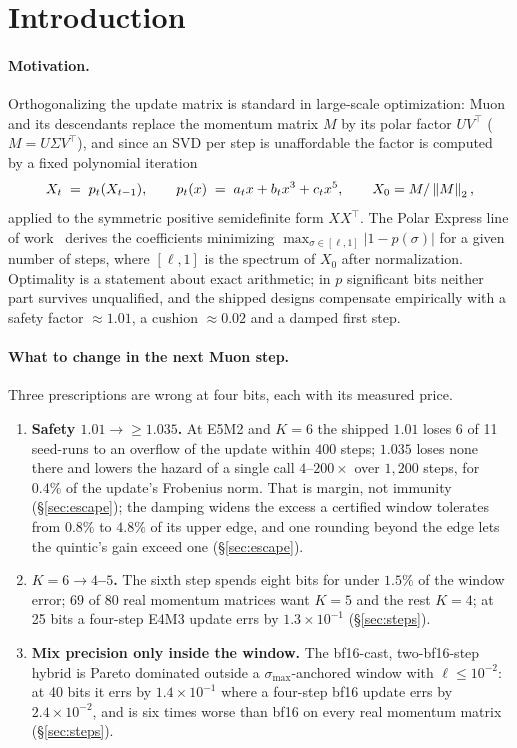 \section{Introduction}

\paragraph{Motivation.}
Orthogonalizing the update matrix is standard in large-scale optimization: Muon and its
descendants replace the momentum matrix $M$ by its polar factor $UV^\top$
($M = U\Sigma V^\top$), and since an SVD per step is unaffordable the factor is computed
by a fixed polynomial iteration
\begin{equation}
X_{t} \;=\; p_t(X_{t-1}), \qquad
p_t(x) \;=\; a_t x + b_t x^3 + c_t x^5 , \qquad X_0 = M/\left\lVert M \right\rVert_2 ,
\label{eq:iter}
\end{equation}
applied to the symmetric positive semidefinite form $XX^\top$.  The Polar Express
line of work~\cite{amsel2025polar} derives the coefficients minimizing
$\max_{\sigma\in[\ell,1]} |1 - p(\sigma)|$ for a given number of steps, where
$[\ell,1]$ is the spectrum of $X_0$ after normalization.  Optimality is a statement
about exact arithmetic; in $p$ significant bits neither part survives unqualified, and
the shipped designs compensate empirically with a safety factor $\approx1.01$, a cushion
$\approx0.02$ and a damped first step.

\paragraph{What to change in the next Muon step.}
Three prescriptions are wrong at four bits, each with its measured price.
\begin{enumerate}
\item \textbf{Safety $1.01 \to \ge 1.035$.}  At E5M2 and $K=6$ the shipped $1.01$
  loses 6 of 11 seed-runs to an overflow of the update within $400$ steps; $1.035$ loses
  none there and lowers the hazard of a single call $4$--$200\times$ over $1{,}200$ steps,
  for $0.4\%$ of the update's Frobenius norm.  That is margin, not immunity (\S\ref{sec:escape});
  the damping widens the excess a certified
  window tolerates from $0.8\%$ to $4.8\%$ of its upper edge, and one rounding beyond the
  edge lets the quintic's gain exceed one (\S\ref{sec:escape}).
\item \textbf{$K=6 \to 4$--$5$.}  The sixth step spends eight bits for under $1.5\%$ of
  the window error; $69$ of $80$ real momentum matrices want $K=5$ and the rest $K=4$;
  at 25 bits a four-step E4M3 update errs by $1.3\times10^{-1}$
  (\S\ref{sec:steps}).
\item \textbf{Mix precision only inside the window.}  The bf16-cast, two-bf16-step
  hybrid is Pareto dominated outside a $\sigma_{\max}$-anchored window with
  $\ell\le10^{-2}$: at 40 bits it errs by $1.4\times10^{-1}$ where a four-step bf16
  update errs by $2.4\times10^{-2}$, and is six times worse than bf16 on every real
  momentum matrix (\S\ref{sec:steps}).
\end{enumerate}

